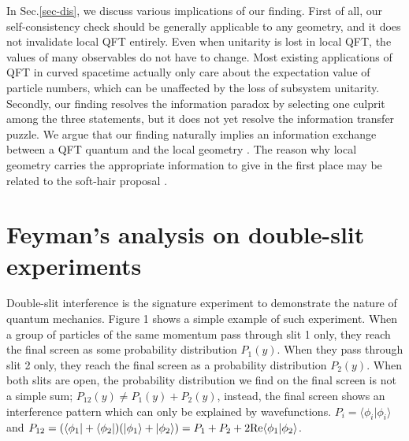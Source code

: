 \documentclass[aps,showpacs,twocolumn,floats,prd,superscriptaddress,nofootinbib]{revtex4-1}
\begin{document}
In Sec.\ref{sec-dis}, we discuss various implications of our finding. 
First of all, our self-consistency check should be generally applicable to any geometry, and it does not invalidate local QFT entirely. 
Even when unitarity is lost in local QFT, the values of many observables do not have to change. 
Most existing applications of QFT in curved spacetime actually only care about the expectation value of particle numbers, which can be unaffected by the loss of subsystem unitarity. 
Secondly, our finding resolves the information paradox by selecting one culprit among the three statements, but it does not yet resolve the information transfer puzzle. 
We argue that our finding naturally implies an information exchange between a QFT quantum and the local geometry \cite{OsuPag16}.
The reason why local geometry carries the appropriate information to give in the first place may be related to the soft-hair proposal \cite{HawPer16}. 

\section{Feyman's analysis on double-slit experiments}
\label{sec-DoubleSlit}

Double-slit interference is the signature experiment to demonstrate the nature of quantum mechanics. Figure 1 shows a simple example of such experiment.
When a group of particles of the same momentum pass through slit 1 only, they reach the final screen as some probability distribution $P_1(y)$. 
When they pass through slit 2 only, they reach the final screen as a probability distribution $P_2(y)$.
When both slits are open, the probability distribution we find on the final screen is not a simple sum; $P_{12}(y) \neq P_1(y) + P_2(y)$,
instead, the final screen shows an interference pattern which can only be explained by wavefunctions.
$P_i = \langle \phi_i | \phi_i \rangle$ and $P_{12} = (\langle \phi_1|+\langle \phi_2| ) (|\phi_1\rangle + | \phi_2 \rangle)=P_1 + P_2 + 2{\rm Re}\langle\phi_1|\phi_2\rangle$.
\end{document}

